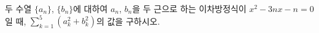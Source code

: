 두 수열 $\{a_n\}$, $\{b_n\}$에 대하여 $a_n$, $b_n$을 두 근으로 하는 이차방정식이 $x^2-3nx-n=0$일 때, $\displaystyle\sum_{k=1}^{5} (a_k^2+b_k^2)$의 값을 구하시오.
